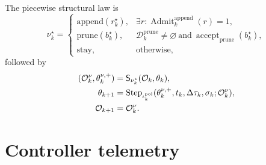 \documentclass[
  reprint,
  amsmath,
  amssymb,
  aps,
  pra,
  nofootinbib,
  superscriptaddress,
  floatfix
]{revtex4-2}
\newcommand{\Oset}{\mathcal{O}}
\newcommand{\Dcal}{\mathcal{D}}
\newcommand{\stay}{\mathrm{stay}}
\newcommand{\app}{\mathrm{append}}
\newcommand{\prune}{\mathrm{prune}}
\begin{document}
The piecewise structural law is
\begin{equation}
\nu_k^\star=
\begin{cases}
\app(r_k^\star),&\exists r:\operatorname{Admit}_k^{\app}(r)=1,\\
\prune(b_k^\star),&\Dcal_k^{\prune}\neq\varnothing\
\text{and}\ \operatorname{accept}_{\prune}(b_k^\star),\\
\stay,&\text{otherwise,}
\end{cases}
\label{eq:hybrid_lane}
\end{equation}
followed by
\begin{equation}
\begin{aligned}
(\Oset_k^\nu,\theta_k^{\nu,+})&=\mathsf S_{\nu_k^\star}(\Oset_k,\theta_k),\\
\theta_{k+1}
&=\operatorname{Step}_{\iota_k^{\rm pol}}
(\theta_k^{\nu,+},t_k,\Delta\tau_k,\sigma_k;\Oset_k^\nu),\\
\Oset_{k+1}&=\Oset_k^\nu .
\end{aligned}
\label{eq:piecewise_smooth_law}
\end{equation}

\section{Controller telemetry}
\label{app:controller_telemetry}
\end{document}
